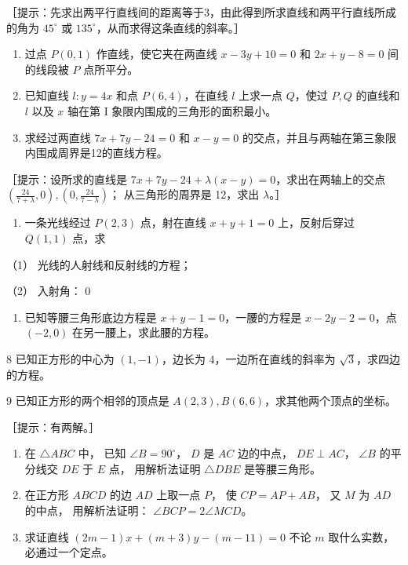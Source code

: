 ［提示：先求出两平行直线间的距离等于3，由此得到所求直线和两平行直线所成的角为
\(45^{\circ}\) 或 \(135^{\circ}\)，从而求得这条直线的斜率。］

\begin{enumerate}
\def\labelenumi{\arabic{enumi}.}
\setcounter{enumi}{2}
\item
  过点 \(P(0,1)\) 作直线，使它夹在两直线 \(x - 3y + 10 = 0\) 和
  \(2x + y - 8 = 0\) 间的线段被 \(P\) 点所平分。
\item
  已知直线 \(l: y = 4x\) 和点 \(P(6, 4)\)，在直线 \(l\) 上求一点
  \(Q\)，使过 \(P, Q\) 的直线和 \(l\) 以及 \(x\) 轴在第 I
  象限内围成的三角形的面积最小。
\item
  求经过两直线 \(7x + 7y - 24 = 0\) 和 \(x - y = 0\)
  的交点，并且与两轴在第三象限内围成周界是12的直线方程。
\end{enumerate}

［提示：设所求的直线是 \(7x+7y-24+\lambda(x-y)=0\)，求出在两轴上的交点
\(\left(\frac{24}{7+\lambda},0\right),\left(0,\frac{24}{7-\lambda}\right)\)；
从三角形的周界是 12，求出 \(\lambda\)。］

\begin{enumerate}
\def\labelenumi{\arabic{enumi}.}
\setcounter{enumi}{5}
\tightlist
\item
  一条光线经过 \(P(2,3)\) 点，射在直线 \(x + y + 1 = 0\) 上，反射后穿过
  \(Q(1,1)\) 点，求
\end{enumerate}

（1） 光线的人射线和反射线的方程；

（2） 入射角： 0

\begin{enumerate}
\def\labelenumi{\arabic{enumi}.}
\setcounter{enumi}{6}
\tightlist
\item
  已知等腰三角形底边方程是 \(x + y - 1 = 0\)，一腰的方程是
  \(x - 2y - 2 = 0\)，点 \((-2, 0)\) 在另一腰上，求此腰的方程。
\end{enumerate}

8 已知正方形的中心为 \((1, -1)\)，边长为 4，一边所在直线的斜率为
\(\sqrt{3}\)，求四边的方程。

9 已知正方形的两个相邻的顶点是
\(A(2,3), B(6,6)\)，求其他两个顶点的坐标。

［提示：有两解。］

\begin{enumerate}
\def\labelenumi{\arabic{enumi}.}
\setcounter{enumi}{9}
\item
  在 \(\triangle ABC\) 中， 已知 \(\angle B = 90^\circ\)， \(D\) 是
  \(AC\) 边的中点， \(DE \perp AC\)， \(\angle B\) 的平分线交 \(DE\) 于
  \(E\) 点， 用解析法证明 \(\triangle DBE\) 是等腰三角形。
\item
  在正方形 \(ABCD\) 的边 \(AD\) 上取一点 \(P\)， 使 \(CP = AP + AB\)，
  又 \(M\) 为 \(AD\) 的中点， 用解析法证明：
  \(\angle BCP = 2\angle MCD\)。
\item
  求证直线 \((2m - 1)x + (m + 3)y - (m - 11) = 0\) 不论 \(m\)
  取什么实数，必通过一个定点。
\end{enumerate}

